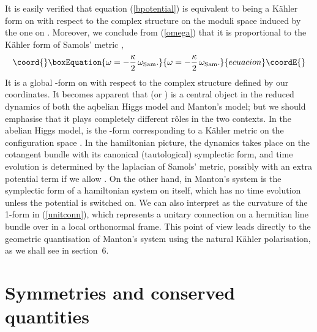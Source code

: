 \documentclass[a4paper,11pt]{article}
\begin{document}
It is easily verified that equation (\ref{bpotential}) is equivalent to  
\myHighlight{$\omega$}\coordHE{} being a K\"ahler form on \coordHE{} with respect to the complex 
structure on the moduli space induced by the one on \myHighlight{$\Sigma$}\coordHE{}. 
Moreover, we conclude from 
(\ref{omega}) that it is proportional to the K\"ahler form \coordHE{} of Samols' metric \cite{Sam},
\begin{equation}\coord{}\boxEquation{ \label{relwwSam}
\omega=-\frac{\kappa}{2}\,\omega_{\rm Sam}.
}{ \omega=-\frac{\kappa}{2}\,\omega_{\rm Sam}.
}{ecuacion}\coordE{}\end{equation}
It is a global \coordHE{}-form on \coordHE{} with respect to the
complex structure defined by our coordinates.
It becomes apparent that \coordHE{} (or \myHighlight{$\omega$}\coordHE{})
is a central object in the reduced dynamics of both the
aqbelian Higgs model and Manton's model; but we should emphasise
that it plays completely different r\^oles in the two contexts.
In the abelian Higgs model, \coordHE{} is the \coordHE{}-form
corresponding to a K\"ahler metric on the configuration space 
\coordHE{}. In the hamiltonian picture, the dynamics  
takes place on the cotangent bundle \coordHE{} with its 
canonical (tautological) symplectic form, and time evolution is
determined by the laplacian of Samols' metric, possibly with an
extra potential term if we allow \coordHE{}.
On the other hand, in Manton's system \myHighlight{$\omega$}\coordHE{} is the
symplectic form of a hamiltonian system on \coordHE{}
itself, which has no time evolution unless the potential \coordHE{}
is switched on. We can also interpret \myHighlight{$\omega$}\coordHE{} as the curvature of the
1-form \coordHE{} in (\ref{unitconn}), which represents a unitary
connection on a hermitian line bundle over \coordHE{} in a local
orthonormal frame. This point of view leads directly to the geometric
quantisation of Manton's system using the natural K\"ahler
polarisation, as we shall see in section~6.



\section {Symmetries and conserved quantities}
\end{document}
